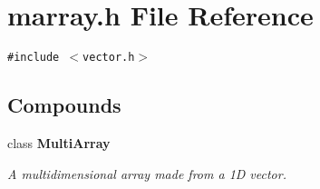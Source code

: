\section{marray.h File Reference}
\label{marray_h}
{\tt \#include $<$vector.h$>$}\par
\subsection*{Compounds}
\begin{CompactItemize}
\item 
class {\bf Multi\-Array}
\begin{CompactList}\small\item\em A multidimensional array made from a 1D vector.\item\end{CompactList}\end{CompactItemize}
